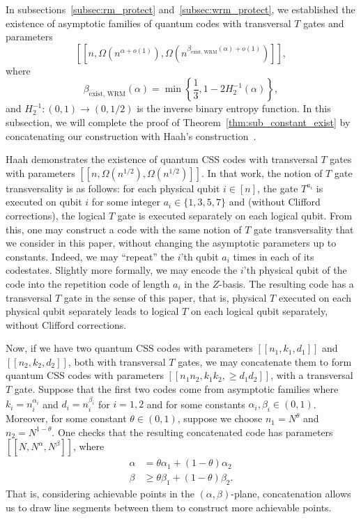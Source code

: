 \documentclass{article}
\begin{document}
In subsections~\ref{subsec:rm_protect} and~\ref{subsec:wrm_protect}, we established the existence of asymptotic families of quantum codes with transversal $T$ gates and parameters
\begin{equation}
    \left[\left[n,\Omega\left(n^{\alpha + o(1)}\right),\Omega\left(n^{\beta_{\text{exist, WRM}}(\alpha)+o(1)}\right)\right]\right],
\end{equation}
where
\begin{equation}\label{eq:beta_exist_wrm}
    \beta_{\text{exist, WRM}}(\alpha) = \min\left\{\frac{1}{3}, 1-2H_2^{-1}(\alpha)\right\},
\end{equation}
and $H_2^{-1}:(0,1)\to(0,1/2)$ is the inverse binary entropy function. In this subsection, we will complete the proof of Theorem~\ref{thm:sub_constant_exist} by concatenating our construction with Haah's construction~\cite{haah2018towers}.

Haah demonstrates the existence of quantum CSS codes with transversal $T$ gates with parameters $[[n,\Omega(n^{1/2}), \Omega(n^{1/2})]]$. In that work, the notion of $T$ gate transversality is as follows: for each physical qubit $i \in [n]$, the gate $T^{a_i}$ is executed on qubit $i$ for some integer $a_i \in \{1,3,5,7\}$ and (without Clifford corrections), the logical $T$ gate is executed separately on each logical qubit. From this, one may construct a code with the same notion of $T$ gate transversality that we consider in this paper, without changing the asymptotic parameters up to constants. Indeed, we may ``repeat'' the $i$'th qubit $a_i$ times in each of its codestates. Slightly more formally, we may encode the $i$'th physical qubit of the code into the repetition code of length $a_i$ in the $Z$-basis. The resulting code has a transversal $T$ gate in the sense of this paper, that is, physical $T$ executed on each physical qubit separately leads to logical $T$ on each logical qubit separately, without Clifford corrections.

Now, if we have two quantum CSS codes with parameters $[[n_1, k_1, d_1]]$ and $[[n_2, k_2, d_2]]$, both with transversal $T$ gates, we may concatenate them to form quantum CSS codes with parameters $[[n_1n_2, k_1k_2, \geq d_1d_2]]$, with a transversal $T$ gate. Suppose that the first two codes come from asymptotic families where $k_i = n_i^{\alpha_i}$ and $d_i = n_i^{\beta_i}$ for $i = 1,2$ and for some constants $\alpha_i, \beta_i \in (0,1)$. Moreover, for some constant $\theta \in (0,1)$, suppose we choose $n_1 = N^\theta$ and $n_2 = N^{1-\theta}$. One checks that the resulting concatenated code has parameters $[[N,N^\alpha,N^\beta]]$, where
\begin{align}
    \alpha &= \theta \alpha_1 + (1-\theta)\alpha_2\\
    \beta &\geq \theta\beta_1 + (1-\theta)\beta_2.
\end{align}
That is, considering achievable points in the $(\alpha,\beta)$-plane, concatenation allows us to draw line segments between them to construct more achievable points. 
\end{document}
